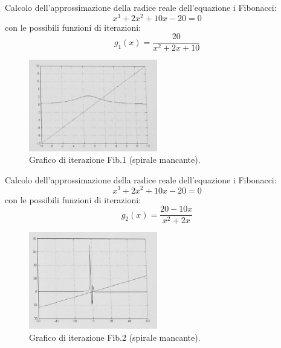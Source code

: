 \newpage
\begin{ex}
    Calcolo dell'approssimazione della radice reale dell'equazione i Fibonacci:
    \begin{displaymath}
        x^3+2x^2+10x-20=0
    \end{displaymath}
    con le possibili funzioni di iterazioni:
    \begin{displaymath}
        g_1(x) = \frac{20}{x^2+2x+10}
    \end{displaymath}
    \begin{figure}[h!]
        \centering 
        \includegraphics[width=0.5\textwidth]{Esterni/Altro/imgs/20250226_095026.jpg} 
        \caption{Grafico di iterazione Fib.1 (spirale mancante).} 
        \label{fig:fib1} 
    \end{figure}
\end{ex}
\begin{ex}
    Calcolo dell'approssimazione della radice reale dell'equazione i Fibonacci:
    \begin{displaymath}
        x^3+2x^2+10x-20=0
    \end{displaymath}
    con le possibili funzioni di iterazioni:
    \begin{displaymath}
        g_2(x) = \frac{20-10x}{x^2+2x}
    \end{displaymath}
    \begin{figure}[h!]
        \centering 
        \includegraphics[width=0.5\textwidth]{Esterni/Altro/imgs/20250226_095154.jpg} 
        \caption{Grafico di iterazione Fib.2 (spirale mancante).} 
        \label{fig:fib2} 
    \end{figure}
\end{ex}

